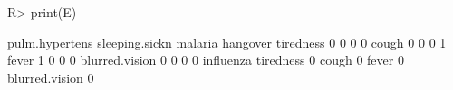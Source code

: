 \begin{Schunk}
% --begin: "comp.e"
\begin{Sinput}
R> print(E)
\end{Sinput}
\begin{Soutput}
               pulm.hypertens sleeping.sickn malaria hangover
tiredness                   0              0       0        0
cough                       0              0       0        1
fever                       1              0       0        0
blurred.vision              0              0       0        0
               influenza
tiredness              0
cough                  0
fever                  0
blurred.vision         0
\end{Soutput}
%
% --end: "comp.e"
\end{Schunk}
